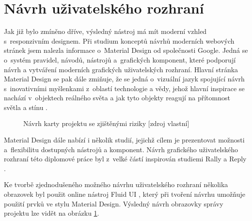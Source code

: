 \section{Návrh uživatelského rozhraní}


Jak již bylo zmíněno dříve, výsledný nástroj má mít moderní vzhled s~responzivním designem. Při studium konceptů návrhů moderních webových stránek jsem nalezla informace o~Material Design od společnosti Google. Jedná se o~systém pravidel, návodů, nástrojů a~grafických komponent, které podporují návrh a vytváření moderních grafických uživatelských rozhraní. Hlavní stránka Material Design se pak dále zmiňuje, že se jedná o~vizuální jazyk spojující návrh s~inovativními myšlenkami z~oblastí technologie a vědy, jehož hlavní inspirace se nachází v~objektech reálného světa a jak tyto objekty reagují na přítomnost světla a stínu \cite{MaterialDesign}.

    \begin{figure}[!htbp]
    \begin{center}
    \caption{Návrh karty projektu se zjištěnými riziky [zdroj vlastní]}
    \label{guiProjekt}
    \end{center}
    \end{figure}

Material Design dále nabízí i několik studií, jejichž cílem je prezentovat možnosti a~flexibilitu dostupných nástrojů a komponent. Návrh grafického uživatelského rozhraní této diplomové práce byl z~velké částí inspirován studiemi Rally \cite{Rally} a Reply \cite{Reply}.

Ke tvorbě zjednodušeného možného návrhu uživatelského rozhraní několika obrazovek byl použit online nástroj Fluid UI \cite{FluidUI}, který při tvoření návrhu umožňuje použití prvků ve stylu Material Design. Výsledný návrh obrazovky správy projektu lze vidět na obrázku \ref{guiProjekt}.

